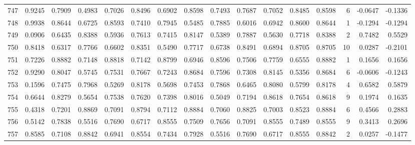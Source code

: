 \begin{tabular}{lrrrrrrrrrrrrrrr}
747 &      0.9245 &  0.7909 &  0.4983 &  0.7026 &  0.8496 &  0.6902 &  0.8598 &  0.7493 &  0.7687 &  0.7052 &   0.8485 &     0.8598 &      6 &                   -0.0647 &                    -0.1336 \\
748 &      0.9938 &  0.8644 &  0.6725 &  0.8593 &  0.7410 &  0.7945 &  0.5485 &  0.7885 &  0.6016 &  0.6942 &   0.8600 &     0.8644 &      1 &                   -0.1294 &                    -0.1294 \\
749 &      0.0906 &  0.6435 &  0.8388 &  0.5936 &  0.7613 &  0.7415 &  0.8147 &  0.5389 &  0.7887 &  0.5630 &   0.7718 &     0.8388 &      2 &                    0.7482 &                     0.5529 \\
750 &      0.8418 &  0.6317 &  0.7766 &  0.6602 &  0.8351 &  0.5490 &  0.7717 &  0.6738 &  0.8491 &  0.6894 &   0.8705 &     0.8705 &     10 &                    0.0287 &                    -0.2101 \\
751 &      0.7226 &  0.8882 &  0.7148 &  0.8818 &  0.7142 &  0.8799 &  0.6946 &  0.8596 &  0.7506 &  0.7759 &   0.6555 &     0.8882 &      1 &                    0.1656 &                     0.1656 \\
752 &      0.9290 &  0.8047 &  0.5745 &  0.7531 &  0.7667 &  0.7243 &  0.8684 &  0.7596 &  0.7308 &  0.8145 &   0.5356 &     0.8684 &      6 &                   -0.0606 &                    -0.1243 \\
753 &      0.1596 &  0.7475 &  0.7968 &  0.5269 &  0.8178 &  0.5698 &  0.7453 &  0.7868 &  0.6465 &  0.8080 &   0.5799 &     0.8178 &      4 &                    0.6582 &                     0.5879 \\
754 &      0.6644 &  0.8279 &  0.5654 &  0.7538 &  0.7620 &  0.7398 &  0.8016 &  0.5049 &  0.7194 &  0.8618 &   0.7654 &     0.8618 &      9 &                    0.1974 &                     0.1635 \\
755 &      0.4318 &  0.7201 &  0.8869 &  0.7091 &  0.8794 &  0.7112 &  0.8884 &  0.7060 &  0.8825 &  0.7003 &   0.8523 &     0.8884 &      6 &                    0.4566 &                     0.2883 \\
756 &      0.5142 &  0.7838 &  0.5516 &  0.7690 &  0.6717 &  0.8555 &  0.7509 &  0.7656 &  0.7091 &  0.8555 &   0.7489 &     0.8555 &      9 &                    0.3413 &                     0.2696 \\
757 &      0.8585 &  0.7108 &  0.8842 &  0.6941 &  0.8554 &  0.7434 &  0.7928 &  0.5516 &  0.7690 &  0.6717 &   0.8555 &     0.8842 &      2 &                    0.0257 &                    -0.1477 \\

\end{tabular}
